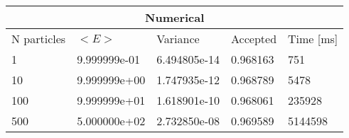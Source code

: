 \begin{tabular}{|l|l|l|l|l|}
\hline 
\multicolumn{5}{|c|}{Numerical}\\ 
\hline 
N particles & $<E>$ & Variance & Accepted & Time [ms]\\ 
 \hline 
1 & 9.999999e-01 & 6.494805e-14 & 0.968163 & 751 \\ 
\hline10 & 9.999999e+00 & 1.747935e-12 & 0.968789 & 5478 \\ 
\hline100 & 9.999999e+01 & 1.618901e-10 & 0.968061 & 235928 \\ 
\hline500 & 5.000000e+02 & 2.732850e-08 & 0.969589 & 5144598 \\ 
\hline\end{tabular}